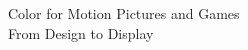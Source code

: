 \begin{titlepage}
\vspace*{10em}
\begin{center}
    {\huge Color for Motion Pictures and Games}\\
    \vspace{5mm}
    {\Large From Design to Display}
\end{center}
\vspace{5mm}


\end{titlepage}
